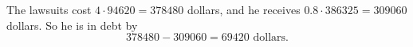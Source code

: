 The lawsuits cost $4\cdot94620=378480$ dollars, and he receives $0.8\cdot386325=309060$ dollars. So he is in debt by
\[378480-309060=\boxed{69420}\text{ dollars}.\]
